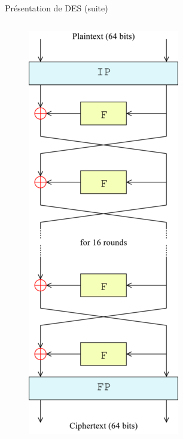 \documentclass{beamer}
\begin{document}
\begin{frame}{Présentation de DES (suite)}
	\begin{columns}
	\begin{column}{0.3\textwidth}
	\begin{figure}
		\centering
		\includegraphics[scale=0.32]{DESwiki}
		\label{deswiki}
	\end{figure}
	\end{column}
	\begin{column}{0.7\textwidth}
	\begin{figure}
		\centering


\end{figure}
\end{column}
\end{columns}
\end{frame}
\end{document}

